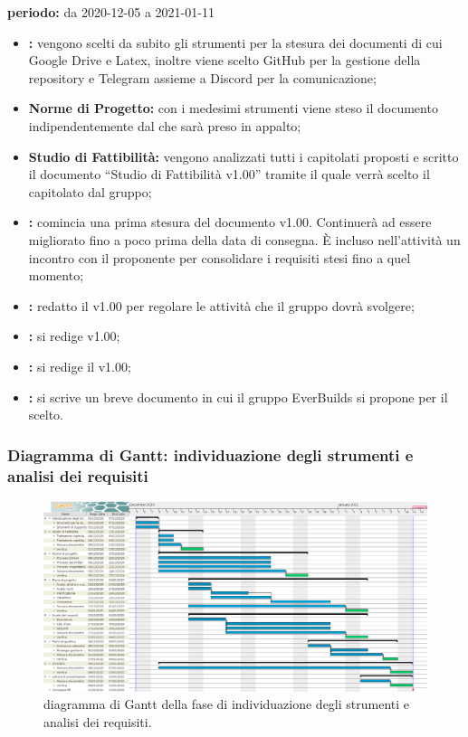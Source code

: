 	\textbf{periodo:} da 2020-12-05 a 2021-01-11 
	\begin{itemize}
		\item \textbf{:} vengono scelti da subito gli strumenti per la stesura dei documenti di cui Google Drive e Latex, inoltre viene scelto GitHub per la gestione della repository e Telegram assieme a Discord per la comunicazione;
		\item \textbf{Norme di Progetto:} con i medesimi strumenti viene steso il documento  indipendentemente dal  che sarà preso in appalto;
		\item \textbf{Studio di Fattibilità:} vengono analizzati tutti i capitolati proposti e scritto il documento “Studio di Fattibilità v1.00” tramite il quale verrà scelto il capitolato dal gruppo;
		\item \textbf{:} comincia una prima stesura del documento  v1.00. Continuerà ad essere migliorato fino a poco prima della data di consegna. È incluso nell’attività un incontro con il proponente per consolidare i requisiti stesi fino a quel momento;
		\item \textbf{:} redatto il  v1.00 per regolare le attività che il gruppo dovrà svolgere;
		\item \textbf{:} si redige  v1.00;		
		\item \textbf{:} si redige il  v1.00;
		\item \textbf{:} si scrive un breve documento in cui il gruppo EverBuilds si propone per il  scelto.
	\end{itemize}  

	\subsubsection{Diagramma di Gantt: individuazione degli strumenti e analisi dei requisiti}
	
		\begin{figure}[H]
			\centering
			\includegraphics[width=1\linewidth]{./res/images/StrumentiRequisiti.png}
			\caption{diagramma di Gantt della fase di individuazione degli strumenti e analisi dei requisiti.}
			\label{fig:diagramma di Gantt della fase di individuazione degli strumenti e analisi dei requisiti.}
		\end{figure}
	
